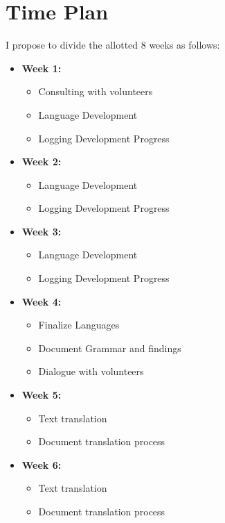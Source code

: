 \documentclass[a4paper,10pt]{article}
\begin{document}
\section{Time Plan}
I propose to divide the allotted 8 weeks as follows:
\begin{itemize}
    \item \textbf{Week 1:}
        \begin{itemize}
            \item Consulting with volunteers
            \item Language Development
            \item Logging Development Progress
        \end{itemize}
    \item \textbf{Week 2:}
        \begin{itemize}
            \item Language Development
            \item Logging Development Progress
        \end{itemize}
    \item \textbf{Week 3:}
        \begin{itemize}
            \item Language Development
            \item Logging Development Progress
        \end{itemize}
    \item \textbf{Week 4:}
        \begin{itemize}
            \item Finalize Languages
            \item Document Grammar and findings
            \item Dialogue with volunteers
        \end{itemize}
    \item \textbf{Week 5:}
        \begin{itemize}
            \item Text translation
            \item Document translation process
        \end{itemize}
    \pagebreak
    \item \textbf{Week 6:}
        \begin{itemize}
            \item Text translation
            \item Document translation process
        \end{itemize}

\end{itemize}
\end{document}
